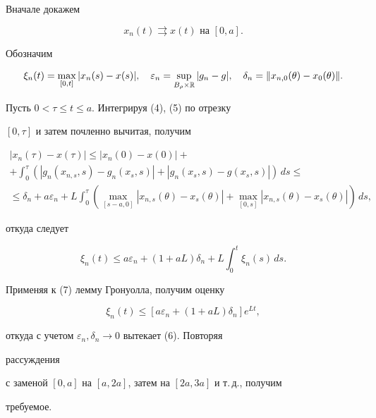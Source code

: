 \begin{pf}


Вначале докажем


\begin{equation}


x_n(t)\rightrightarrows x(t)\text{\ на\ }[0,a].


\end{equation}


Обозначим


$$


\xi_n(t)=\max_{[0,t]}| x_n(s)-x(s)|,\quad


\varepsilon_n=\sup_{B_{\rho}\times\Bbb R}| g_n-g|,\quad


\delta_n=\| x_{n,0}(\theta)-x_0(\theta)\| .


$$


Пусть $0<\tau\leqslant t\leqslant a$. Интегрируя (4), (5) по отрезку


$[0,\tau]$ и затем почленно вычитая, получим


\begin{gather*}


| x_n(\tau)-x(\tau)|\leqslant| x_n(0)-x(0)|+


\\ +\int_0^{\tau}\left( | g_n(x_{n,s},s)-g_n(x_s,s)|+


| g_n(x_s,s)-g(x_s,s)|\right) \,ds\leqslant\\


\leqslant\delta_n+a\varepsilon_n+L\int_0^{\tau}


(\max_{[s-a,0]}| x_{n,s}(\theta)-x_s(\theta)|+


\max_{[0,s]}| x_{n,s}(\theta)-x_s(\theta)|)\,ds,


\end{gather*}


откуда следует


\begin{equation}


\xi_n(t)\leqslant


a\varepsilon_n+(1+aL)\delta_n+L\int_0^t\xi_n(s)\,ds.


\end{equation}


Применяя к (7) лемму Гронуолла, получим оценку


$$


\xi_n(t)\leqslant [a\varepsilon_n+(1+aL)\delta_n] e^{Lt},


$$


откуда с учетом $\varepsilon_n,\delta_n\to 0$ вытекает (6). Повторяя


рассуждения


с заменой $[0,a]$ на $[a,2a]$, затем на $[2a,3a]$ и т.\,д., получим


требуемое.


\end{pf}





